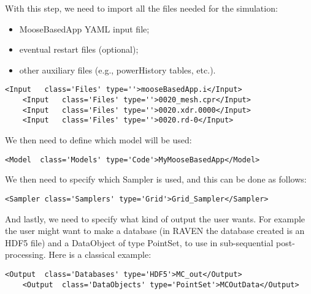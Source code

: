 With this step, we need to import all the files needed for the simulation:
\begin{itemize}
  \item MooseBasedApp YAML input file;
  \item eventual restart files (optional);
  \item other auxiliary files (e.g., powerHistory tables, etc.).
\end{itemize}
\begin{lstlisting}[style=XML,morekeywords={name,class,type}]
    <Input   class='Files' type=''>mooseBasedApp.i</Input>
    <Input   class='Files' type=''>0020_mesh.cpr</Input>
    <Input   class='Files' type=''>0020.xdr.0000</Input>
    <Input   class='Files' type=''>0020.rd-0</Input>
\end{lstlisting}
We then need to define which model will be used:
\begin{lstlisting}[style=XML]
    <Model  class='Models' type='Code'>MyMooseBasedApp</Model>
\end{lstlisting}
We then need to specify which Sampler is used, and this can be done as follows:
\begin{lstlisting}[style=XML]
    <Sampler class='Samplers' type='Grid'>Grid_Sampler</Sampler>
\end{lstlisting}
And lastly, we need to specify what kind of output the user wants.
%
For example the user might want to make a database (in RAVEN the database
created is an HDF5 file) and a DataObject of type PointSet, to use in sub-sequential
post-processing.
%
Here is a classical example:
\begin{lstlisting}[style=XML,morekeywords={class,type}]
    <Output  class='Databases' type='HDF5'>MC_out</Output>
    <Output  class='DataObjects' type='PointSet'>MCOutData</Output>
\end{lstlisting}

